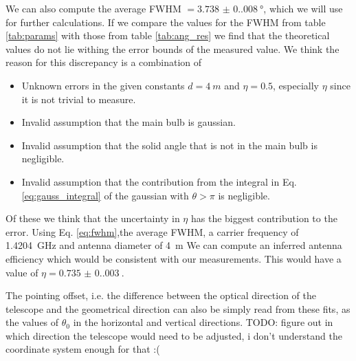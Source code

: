 We can also compute the average FWHM $= \SI{3.738(0.008)}{\degree}$, which we will use for further calculations.
If we compare the values for the FWHM from table \ref{tab:params} with those from table \ref{tab:ang_res}
we find that the theoretical values do not lie withing the error bounds of the measured value.
We think the reason for this discrepancy is a combination of
\begin{itemize}
    \item Unknown errors in the given constants $d = \SI{4}{m}$ and $\eta = 0.5$, especially $\eta$ since it is not trivial to measure.
    \item Invalid assumption that the main bulb is gaussian.
    \item Invalid assumption that the solid angle that is not in the main bulb is negligible.
    \item Invalid assumption that the contribution from the integral in Eq. \eqref{eq:gauss_integral} of the gaussian with $\theta > \pi$ is negligible.
\end{itemize}
Of these we think that the uncertainty in $\eta$ has the biggest contribution to the error. Using Eq. \eqref{eq:fwhm},the average FWHM, a carrier frequency of \SI{1.4204}{\giga \hertz} and antenna diameter of \SI{4}{m}
We can compute an inferred antenna efficiency which would be consistent with our measurements. This would have a value of $\eta = \SI{0.735(0.003)}{}$.

The pointing offset, i.e. the difference between the optical direction of the telescope and the geometrical direction can also be simply read from these fits, as the values of $\theta_0$ in the horizontal and vertical directions.
TODO: figure out in which direction the telescope would need to be adjusted, i don't understand the coordinate system enough for that :(